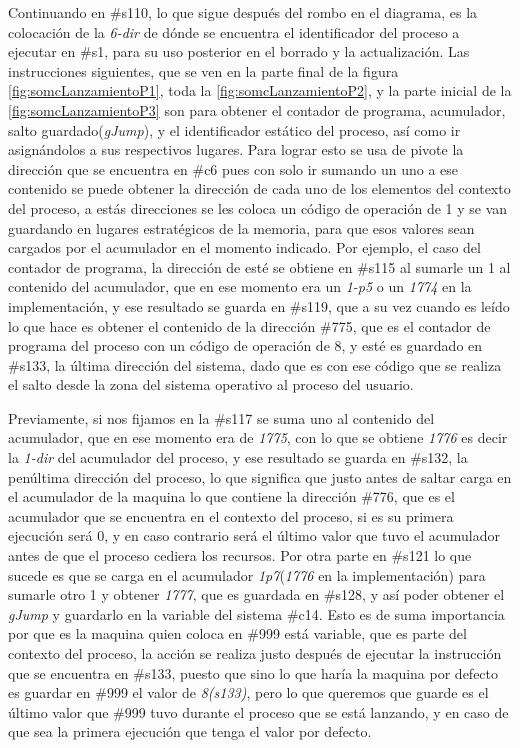 \documentclass[letterpaper,12pt,oneside]{book}
\begin{document}
		Continuando en 	\#s110, lo que sigue después del rombo en el diagrama, es la colocación
		de la \textit{6-dir} de dónde se encuentra el identificador del proceso a ejecutar en \#s1, para su uso posterior 
		en
		el borrado y la actualización. Las instrucciones siguientes, que se ven en la parte final de la figura  \ref{fig:somcLanzamientoP1},
		toda la \ref{fig:somcLanzamientoP2}, y la parte inicial de la \ref{fig:somcLanzamientoP3} son para obtener el contador de programa, acumulador, salto 
		guardado(\textit{gJump}), y
		el  identificador estático del proceso, así como ir asignándolos  a sus respectivos lugares. Para lograr esto se usa de pivote la dirección
		que se encuentra en \#c6 pues con solo ir sumando un uno a ese contenido se puede obtener la dirección de cada uno de los elementos
		del contexto del proceso, a estás direcciones se les coloca un código de operación de 1 y se van guardando en lugares estratégicos de
		la memoria, para que esos valores sean cargados por el acumulador en el momento indicado. Por ejemplo, el caso del contador de programa,
		la dirección de esté se obtiene en \#s115 al sumarle un 1 al contenido del acumulador, que en ese momento era un \textit{1-p5} o un \textit{1774} en
		la implementación, y ese resultado se guarda en \#s119, que a su vez cuando es leído lo que hace es obtener el contenido de la dirección \#775, que es
		el contador de programa del proceso con un código de operación de 8, y esté es guardado en \#s133, la última dirección del sistema, dado
		que es con ese código que se realiza el salto desde la zona del sistema operativo al proceso del usuario.
		
		Previamente, si nos fijamos en la \#s117 se suma uno al contenido del acumulador, que en ese momento era
		de \textit{1775}, con lo que se obtiene \textit{1776} es decir la \textit{1-dir} del acumulador del proceso, y ese resultado se guarda
		en \#s132, la penúltima dirección del proceso, lo que significa que justo antes de saltar carga en el acumulador de la maquina lo que contiene
		la dirección \#776, que es el acumulador que se encuentra en el contexto del proceso, si es su primera ejecución será 0, y en caso contrario
		será el último valor que tuvo el acumulador antes de que el proceso cediera los recursos. Por otra parte en \#s121 lo que sucede es que se carga
		en el acumulador \textit{1p7}(\textit{1776} en la implementación) para sumarle otro 1 y obtener \textit{1777}, que es guardada en \#s128, y así poder obtener el 
		\textit{gJump} y guardarlo en la variable del sistema \#c14. Esto es de suma importancia por que es la maquina quien coloca en \#999 está 	
		variable, que es parte del contexto del proceso, la acción se realiza justo después
		de ejecutar la instrucción que se encuentra en \#s133, puesto que sino lo que haría la maquina por defecto es guardar en \#999 el valor de \textit{8(s133)}, pero lo que
		queremos que guarde es el último valor que \#999  tuvo durante el proceso que se está lanzando, y en caso de que sea la primera ejecución que tenga el valor
		por defecto.
		
\end{document}
